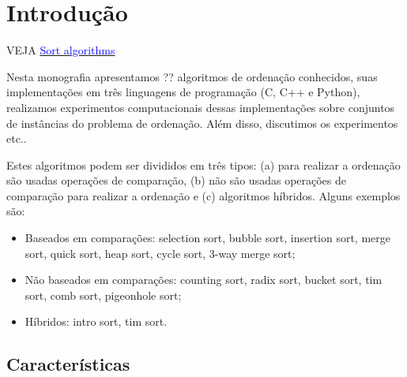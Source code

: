 \chapter{Introdução}

VEJA \href{https://en.wikipedia.org/wiki/Sorting_algorithm}{\textcolor{blue}{Sort algorithms}}

Nesta monografia apresentamos ?? algoritmos de ordenação conhecidos, suas implementações em três linguagens de programação (C, C++ e Python), realizamos experimentos computacionais dessas implementações sobre conjuntos de instâncias do problema de ordenação. Além disso, discutimos os experimentos etc..    

Estes algoritmos podem ser divididos em três tipos: (a) para realizar a ordenação são usadas operações de comparação, (b) não são usadas operações de comparação para realizar a ordenação e (c) algoritmos híbridos. Alguns exemplos são:
\begin{itemize}
    \item Baseados em comparações:  selection sort, bubble sort, insertion sort, merge sort, quick sort, heap sort, cycle sort, 3-way merge sort;

    \item Não baseados em comparações: counting sort, radix sort, bucket sort, tim sort, comb sort, pigeonhole sort;

    \item Híbridos: intro sort, tim sort.
\end{itemize}

\section{Características}

